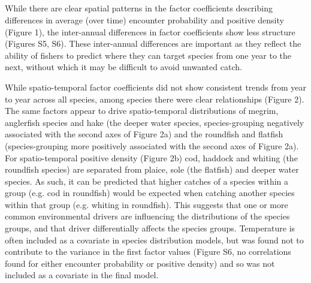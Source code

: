 \documentclass{nature}
\begin{document}
\begin{linenumbers}
\subsection{} While there are clear spatial
patterns in the factor coefficients describing differences in average (over
time) encounter probability and positive density (Figure 1), the inter-annual
differences in factor coefficients show less structure (Figures S5, S6). These
inter-annual differences are important as they reflect the ability of fishers
to predict where they can target species from one year to the next, without
which it may be difficult to avoid unwanted catch.

While spatio-temporal factor coefficients did not show consistent trends from
year to year across all species, among species there were clear
relationships (Figure 2).  The same factors appear to drive spatio-temporal
distributions of megrim, anglerfish species and hake (the deeper water species,
species-grouping negatively associated with the second axes of Figure 2a) and
the roundfish and flatfish (species-grouping more positively associated with
the second axes of Figure 2a). For spatio-temporal positive density (Figure 2b)
cod, haddock and whiting (the roundfish species) are separated from plaice,
sole (the flatfish) and deeper water species. As such, it can be predicted that
higher catches of a species within a group (e.g. cod in roundfish) would be
expected when catching another species within that group (e.g. whiting in
roundfish). This suggests that one or more common environmental drivers are
influencing the distributions of the species groups, and that driver
differentially affects the species groups. Temperature is often included as a
covariate in species distribution models, but was found not to contribute to
the variance in the first factor values (Figure S6, no correlations found for
either encounter probability or positive density) and so was not included as a
covariate in the final model.


\end{linenumbers}
\end{document}
